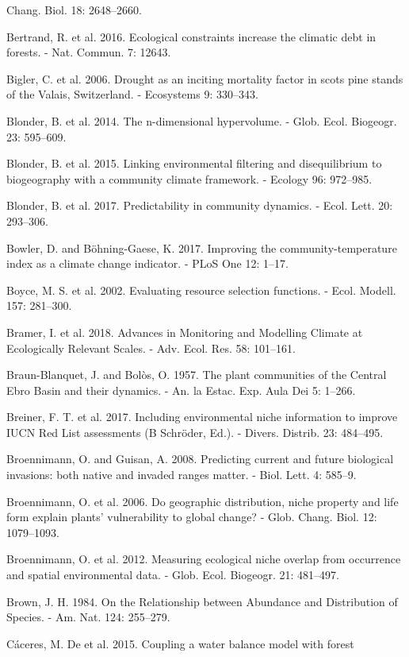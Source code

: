 \documentclass[11pt,twoside]{reedthesis}
\begin{document}
Chang. Biol. 18: 2648--2660.\par
Bertrand, R. et al. 2016. Ecological constraints increase the climatic
debt in forests. - Nat. Commun. 7: 12643.\par
Bigler, C. et al. 2006. Drought as an inciting mortality factor in scots
pine stands of the Valais, Switzerland. - Ecosystems 9: 330--343.\par
Blonder, B. et al. 2014. The n-dimensional hypervolume. - Glob. Ecol.
Biogeogr. 23: 595--609.\par
Blonder, B. et al. 2015. Linking environmental filtering and
disequilibrium to biogeography with a community climate framework. -
Ecology 96: 972--985.\par
Blonder, B. et al. 2017. Predictability in community dynamics. - Ecol.
Lett. 20: 293--306.\par
Bowler, D. and Böhning-Gaese, K. 2017. Improving the
community-temperature index as a climate change indicator. - PLoS One
12: 1--17.\par
Boyce, M. S. et al. 2002. Evaluating resource selection functions. -
Ecol. Modell. 157: 281--300.\par
Bramer, I. et al. 2018. Advances in Monitoring and Modelling Climate at
Ecologically Relevant Scales. - Adv. Ecol. Res. 58: 101--161.\par
Braun-Blanquet, J. and Bolòs, O. 1957. The plant communities of the
Central Ebro Basin and their dynamics. - An. la Estac. Exp. Aula Dei 5:
1--266.\par
Breiner, F. T. et al. 2017. Including environmental niche information to
improve IUCN Red List assessments (B Schröder, Ed.). - Divers. Distrib.
23: 484--495.\par
Broennimann, O. and Guisan, A. 2008. Predicting current and future
biological invasions: both native and invaded ranges matter. - Biol.
Lett. 4: 585--9.\par
Broennimann, O. et al. 2006. Do geographic distribution, niche property
and life form explain plants' vulnerability to global change? - Glob.
Chang. Biol. 12: 1079--1093.\par
Broennimann, O. et al. 2012. Measuring ecological niche overlap from
occurrence and spatial environmental data. - Glob. Ecol. Biogeogr. 21:
481--497.\par
Brown, J. H. 1984. On the Relationship between Abundance and
Distribution of Species. - Am. Nat. 124: 255--279.\par
Cáceres, M. De et al. 2015. Coupling a water balance model with forest
\end{document}
